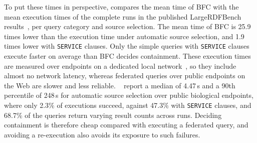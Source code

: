 

To put these times in perspective,  compares the mean time of \ac{BFC} with the mean execution times of the complete runs in the published LargeRDFBench results~\cite{saleem2018largerdfbench}, per query category and source selection.
The mean time of \ac{BFC} is 25.9 times lower than the execution time under automatic source selection, and 1.9 times lower with \texttt{SERVICE} clauses.
Only the simple queries with \texttt{SERVICE} clauses execute faster on average than \ac{BFC} decides containment.
These execution times are measured over endpoints on a dedicated local network~\cite[Sec.~5.1]{saleem2018largerdfbench}, so they include almost no network latency, whereas federated queries over public endpoints on the Web are slower and less reliable.
\citeauthor{crum_iswc_inuse_realworldfed_2026}~\cite{crum_iswc_inuse_realworldfed_2026} report a median of 4.47\,s and a 90th percentile of 248\,s for automatic source selection over public biological endpoints, where only 2.3\% of executions succeed, against 47.3\% with \texttt{SERVICE} clauses, and 68.7\% of the queries return varying result counts across runs.
Deciding containment is therefore cheap compared with executing a federated query, and avoiding a re-execution also avoids its exposure to such failures.
